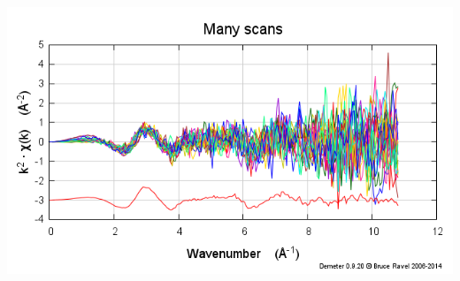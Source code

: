 \documentclass[10pt, xcolor=x11names, compress]{beamer}
\begin{document}
\begin{frame}
\begin{columns}[T]
\begin{column}{0.5\linewidth}
      \includegraphics[width=\linewidth]{images/clt_works.png}
    \end{column}
  \end{columns}
\end{frame}
\end{document}
